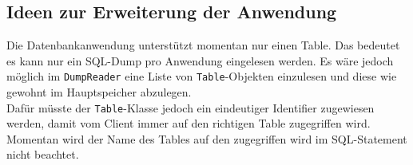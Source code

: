 \subsection{Ideen zur Erweiterung der Anwendung}

Die Datenbankanwendung unterstützt momentan nur einen Table. Das bedeutet es kann nur ein SQL-Dump pro Anwendung eingelesen werden.
Es wäre jedoch möglich im \texttt{DumpReader} eine Liste von \texttt{Table}-Objekten einzulesen und diese wie gewohnt im Hauptspeicher abzulegen.\\
Dafür müsste der \texttt{Table}-Klasse jedoch ein eindeutiger Identifier zugewiesen werden, damit vom Client immer auf den richtigen Table zugegriffen wird.
Momentan wird der Name des Tables auf den zugegriffen wird im SQL-Statement nicht beachtet.

